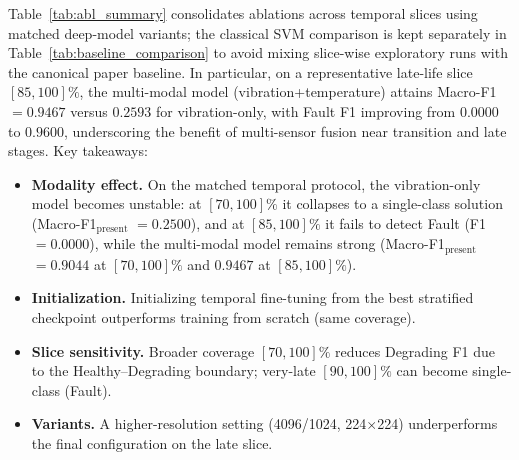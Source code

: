 \documentclass[pdflatex,sn-mathphys-num]{sn-jnl}%
\begin{document}
Table~\ref{tab:abl_summary} consolidates ablations across temporal slices using matched deep-model variants; the classical SVM comparison is kept separately in Table~\ref{tab:baseline_comparison} to avoid mixing slice-wise exploratory runs with the canonical paper baseline. In particular, on a representative late-life slice $[85,100]\%$, the multi-modal model (vibration+temperature) attains Macro-F1 $=0.9467$ versus $0.2593$ for vibration-only, with Fault F1 improving from $0.0000$ to $0.9600$, underscoring the benefit of multi-sensor fusion near transition and late stages. Key takeaways:
\begin{itemize}
  \item \textbf{Modality effect.} On the matched temporal protocol, the vibration-only model becomes unstable: at $[70,100]\%$ it collapses to a single-class solution (Macro-F1$_{\text{present}}$ $=0.2500$), and at $[85,100]\%$ it fails to detect Fault (F1 $=0.0000$), while the multi-modal model remains strong (Macro-F1$_{\text{present}}$ $=0.9044$ at $[70,100]\%$ and $0.9467$ at $[85,100]\%$).
  \item \textbf{Initialization.} Initializing temporal fine-tuning from the best stratified checkpoint outperforms training from scratch (same coverage).
  \item \textbf{Slice sensitivity.} Broader coverage $[70,100]\%$ reduces Degrading F1 due to the Healthy--Degrading boundary; very-late $[90,100]\%$ can become single-class (Fault).
  \item \textbf{Variants.} A higher-resolution setting (4096/1024, 224$\times$224) underperforms the final configuration on the late slice.
\end{itemize}

\end{document}
